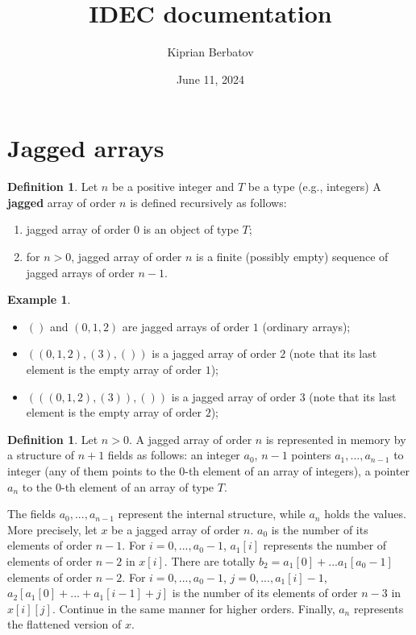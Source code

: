 \documentclass[fleqn]{article}
\title{IDEC documentation}
\author{Kiprian Berbatov}
\date{June 11, 2024}
\theoremstyle{definition}
\newtheorem{definition}[theorem]{Definition}
\newtheorem{example}[theorem]{Example}
\begin{document}
\maketitle

\section{Jagged arrays}

\begin{definition}
  Let $n$ be a positive integer and $T$ be a type (e.g., integers)
  A \textbf{jagged} array of order $n$ is defined recursively as follows:
  \begin{enumerate}
    \item
      jagged array of order $0$ is an object of type $T$;
    \item
      for $n > 0$, jagged array of order $n$ is a finite (possibly empty)
      sequence of jagged arrays of order $n - 1$.
  \end{enumerate}
\end{definition}

\begin{example}
  \leavevmode
  \begin{itemize}
    \item
      $()$ and $(0, 1, 2)$ are jagged arrays of order $1$ (ordinary arrays);
    \item
      $((0, 1, 2), (3), ())$ is a jagged array of order $2$
      (note that its last element is the empty array of order $1$);
    \item
      $(((0, 1, 2), (3)),())$ is a jagged array of order $3$
      (note that its last element is the empty array of order $2$);
  \end{itemize}
\end{example}

\begin{definition}
  Let $n > 0$.
  A jagged array of order $n$ is represented in memory by a structure of $n + 1$
  fields as follows:
  an integer $a_0$,
  $n - 1$ pointers $a_1, ..., a_{n - 1}$ to integer
  (any of them points to the  $0$-th element of an array of integers),
  a pointer $a_n$ to the $0$-th element of an array of type $T$.
  
  The fields $a_0, ..., a_{n - 1}$ represent the internal structure,
  while $a_n$ holds the values.
  More precisely, let $x$ be a jagged array of order $n$.
  $a_0$ is the number of its elements of order $n - 1$.
  For $i = 0, ..., a_0 - 1$,
  $a_1[i]$ represents the number of elements of order $n - 2$ in $x[i]$.
  There are totally $b_2 = a_1[0] + ... a_1[a_0 - 1]$ elements of order $n - 2$.
  For $i = 0, ..., a_0 - 1$, $j  = 0, ..., a_1[i] - 1$,
  $a_2[a_1[0] + ... + a_1[i - 1] + j]$
  is the number of its elements of order $n - 3$ in $x[i][j]$.
  Continue in the same manner for higher orders.
  Finally, $a_n$ represents the flattened version of $x$.
\end{definition}
\end{document}
